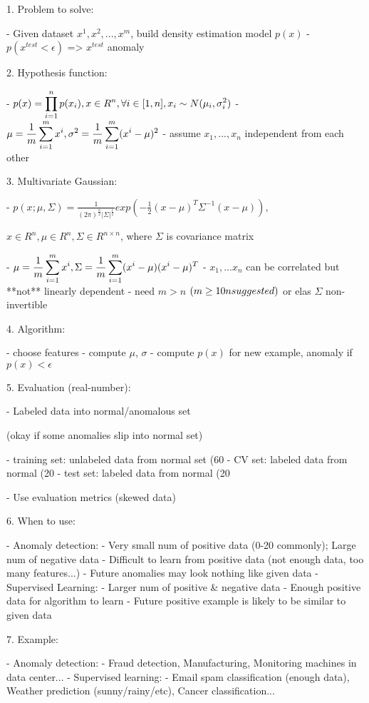 1. Problem to solve:

- Given dataset {$x^1,x^2,...,x^m$}, build density estimation model $p(x)$
- $p(x^{test}<\epsilon)$ => $x^{test}$ anomaly 

2. Hypothesis function: 

- $\displaystyle p(x)=\prod^n_{i=1} p(x_i), \space x \in R^n,\forall i \in [1,n], \space x_i \sim N(\mu_i,\sigma_i^2)$ 
- $\displaystyle \mu=\frac1m \sum^m_{i=1}x^i,\space \sigma^2=\frac1m \sum^m_{i=1}(x^i-\mu)^2$ 
- assume $x_1,...,x_n$ independent from each other

3. Multivariate Gaussian:

- $\displaystyle p(x;\mu,\Sigma)=\frac1{(2\pi)^{\frac n2} |\Sigma|^{\frac 12}} exp(-\frac12 (x-\mu)^T \Sigma^{-1} (x-\mu)),$  

$x\in R^n, \mu\in R^n,\Sigma\in R^{n\times n}$, where $\Sigma$ is covariance matrix

- $\displaystyle \mu=\frac1m \sum^m_{i=1}x^i,\space \Sigma=\frac 1m \sum^m_{i=1}(x^i-\mu)(x^i-\mu)^T$ 
- $x_1,...x_n$ can be correlated but **not** linearly dependent
- need $m > n$ $(m\ge10n\space suggested)$ or elas $\Sigma$ non-invertible

4. Algorithm:

- choose features
- compute $\mu$, $\sigma$
- compute $p(x)$ for new example, anomaly if $p(x) < \epsilon $ 

5. Evaluation (real-number):

- Labeled data into normal/anomalous set

(okay if some anomalies slip into normal set)

- training set: unlabeled data from normal set (60%
- CV set: labeled data from normal (20%
- test set: labeled data from normal (20%

- Use evaluation metrics (skewed data)

6. When to use:

- Anomaly detection:
- Very small num of positive data (0-20 commonly); Large num of negative data
- Difficult to learn from positive data (not enough data, too many features...)
- Future anomalies may look nothing like given data
- Supervised Learning:
- Larger num of positive \& negative data
- Enough positive data for algorithm to learn
- Future positive example is likely to be similar to given data

7. Example:

- Anomaly detection:
- Fraud detection, Manufacturing, Monitoring machines in data center...
- Supervised learning:
- Email spam classification (enough data), Weather prediction (sunny/rainy/etc), Cancer classification...

